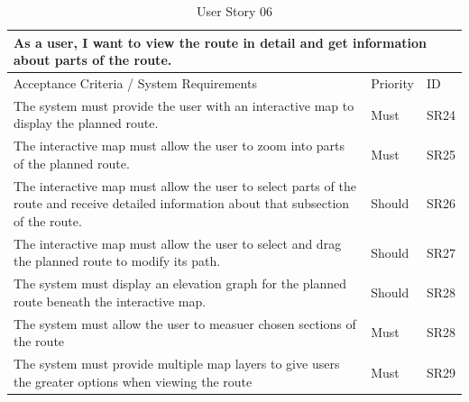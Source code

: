 \begin{table}[!htb]
\caption{User Story 06}
\label{tab:user-story-06}
\begin{tabular}{ p{8cm} p{1cm}  p{1cm} }
\hline
\multicolumn{3}{p{13cm}}{As a user, I want to view the route in detail and get information about parts of the route.}\\ 
\hline
Acceptance Criteria / System Requirements & Priority & ID\\
\hline
The system must provide the user with an interactive map to display the planned route. & Must & SR24 \\
The interactive map must allow the user to zoom into parts of the planned route. & Must & SR25\\
The interactive map must allow the user to select parts of the route and receive detailed information about that subsection of the route. & Should & SR26\\
The interactive map must allow the user to select and drag the planned route to modify its path. & Should & SR27\\ 
The system must display an elevation graph for the planned route beneath the interactive map. & Should & SR28\\
The system must allow the user to measuer chosen sections of the route & Must & SR28\\
The system must provide multiple map layers to give users the greater options when viewing the route & Must & SR29\\ 
\hline
\end{tabular}
\end{table}

